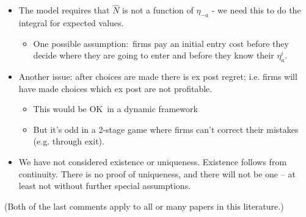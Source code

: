 \documentclass[notes=show]{beamer}
\begin{document}
\begin{frame}%


\begin{itemize}
\item The model requires that $\hat{N}$ is not a function of $\eta _{-a}$ -
we need this to do the integral for expected values.

\begin{itemize}
\item One possible assumption:\ firms pay an initial entry cost before they
decide where they are going to enter and before they know their $\eta
_{a}^{i}$.
\end{itemize}

\item Another issue: after choices are made there is ex post regret; i.e.
firms will have made choices which ex post are not profitable.

\begin{itemize}
\item This would be OK\ in a dynamic framework

\item But it's odd in a 2-stage game where firms can't correct their
mistakes (e.g. through exit).
\end{itemize}

\item We have not considered existence or uniqueness. Existence follows from
continuity. There is no proof of uniqueness, and there will not be one -- at
least not without further special assumptions.
\end{itemize}

(Both of the last comments apply to all or many papers in this literature.)

\end{frame}%
\end{document}
